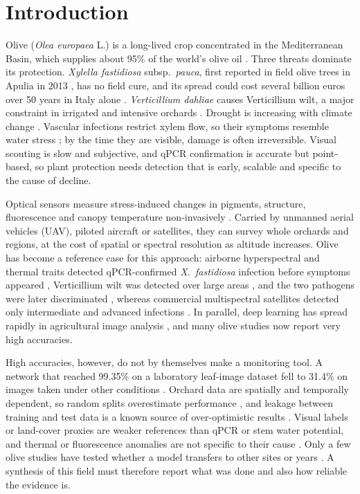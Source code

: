 \documentclass[preprint,12pt]{elsarticle}
\begin{document}
\section{Introduction}\label{sec:intro}
 
Olive (\textit{Olea europaea} L.) is a long-lived crop concentrated in the Mediterranean Basin, which supplies about 95\% of the world's olive oil \citep{Fraga2020Climate,Fraga2021Mediterranean}. Three threats dominate its protection. \textit{Xylella fastidiosa} subsp.\ \textit{pauca}, first reported in field olive trees in Apulia in 2013 \citep{Saponari2013Identification}, has no field cure, and its spread could cost several billion euros over 50 years in Italy alone \citep{Schneider2020Impact}. \textit{Verticillium dahliae} causes Verticillium wilt, a major constraint in irrigated and intensive orchards \citep{LopezEscudero2011Verticillium}. Drought is increasing with climate change \citep{Fraga2020Climate}. Vascular infections restrict xylem flow, so their symptoms resemble water stress \citep{u030}; by the time they are visible, damage is often irreversible. Visual scouting is slow and subjective, and qPCR confirmation is accurate but point-based, so plant protection needs detection that is early, scalable and specific to the cause of decline.
 
Optical sensors measure stress-induced changes in pigments, structure, fluorescence and canopy temperature non-invasively \citep{Mahlein2016Plant,Thomas2018Benefits}. Carried by unmanned aerial vehicles (UAV), piloted aircraft or satellites, they can survey whole orchards and regions, at the cost of spatial or spectral resolution as altitude increases. Olive has become a reference case for this approach: airborne hyperspectral and thermal traits detected qPCR-confirmed \textit{X.~fastidiosa} infection before symptoms appeared \citep{u008}, Verticillium wilt was detected over large areas \citep{u002}, and the two pathogens were later discriminated \citep{u030}, whereas commercial multispectral satellites detected only intermediate and advanced infections \citep{u056}. In parallel, deep learning has spread rapidly in agricultural image analysis \citep{Kamilaris2018Deep}, and many olive studies now report very high accuracies.
 
High accuracies, however, do not by themselves make a monitoring tool. A network that reached 99.35\% on a laboratory leaf-image dataset fell to 31.4\% on images taken under other conditions \citep{Mohanty2016Using,Barbedo2018Factors}. Orchard data are spatially and temporally dependent, so random splits overestimate performance \citep{roberts2017cv,ploton2020spatial}, and leakage between training and test data is a known source of over-optimistic results \citep{kapoor2023leakage}. Visual labels or land-cover proxies are weaker references than qPCR or stem water potential, and thermal or fluorescence anomalies are not specific to their cause \citep{Kuska2018Aiming}. Only a few olive studies have tested whether a model transfers to other sites or years \citep{u081,u113,u133}. A synthesis of this field must therefore report what was done and also how reliable the evidence is.
 
\end{document}

